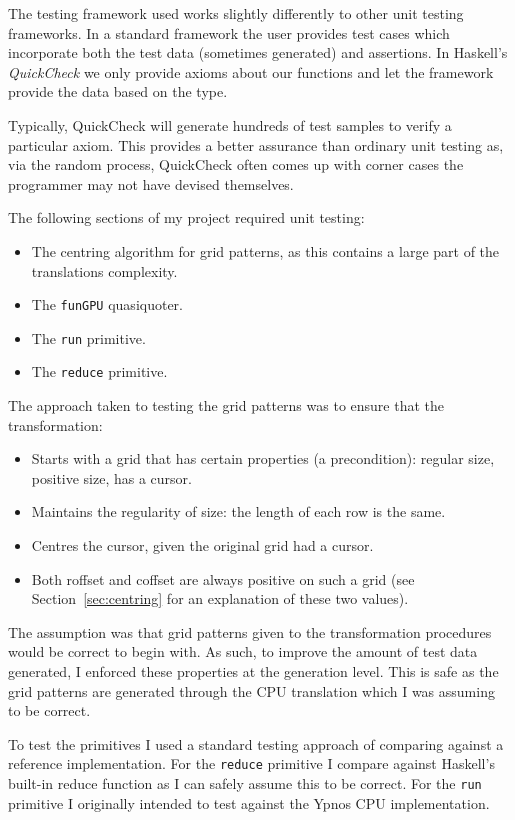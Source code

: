 \documentclass[
    12pt,
    a4paper,
    twoside,
    openright,
    ]{scrbook}
\begin{document}
The testing framework used works slightly differently to other unit testing
frameworks. In a standard framework the user provides test cases which
incorporate both the test data (sometimes generated) and assertions. In
Haskell's \emph{QuickCheck} we only provide axioms about our functions and let
the framework provide the data based on the type.

Typically, QuickCheck will generate hundreds of test samples to verify a
particular axiom. This provides a better assurance than ordinary unit
testing as, via the random process, QuickCheck often comes up with corner
cases the programmer may not have devised themselves.

The following sections of my project required unit testing:

\begin{itemize}
\item The centring algorithm for grid patterns, as this contains a large part of
  the translations complexity.
\item The \texttt{funGPU} quasiquoter.
\item The \texttt{run} primitive.
\item The \texttt{reduce} primitive.
\end{itemize}

The approach taken to testing the grid patterns was to ensure that the
transformation:

\begin{itemize}
\item
  Starts with a grid that has certain properties (a precondition):
  regular size, positive size, has a cursor.
\item
  Maintains the regularity of size: the length of each row is the same.
\item
  Centres the cursor, given the original grid had a cursor.
\item
  Both roffset and coffset are always positive on such a grid (see
  Section~\ref{sec:centring} for an explanation of these two values).
\end{itemize}

The assumption was that grid patterns given to the transformation procedures
would be correct to begin with. As such, to improve the amount of test data
generated, I enforced these properties at the generation level. This is safe as
the grid patterns are generated through the CPU translation which I was assuming
to be correct.

To test the primitives I used a standard testing approach of comparing against a
reference implementation. For the \texttt{reduce} primitive I compare against
Haskell's built-in reduce function as I can safely assume this to be
correct. For the \texttt{run} primitive I originally intended to test against
the Ypnos CPU implementation.
\end{document}
